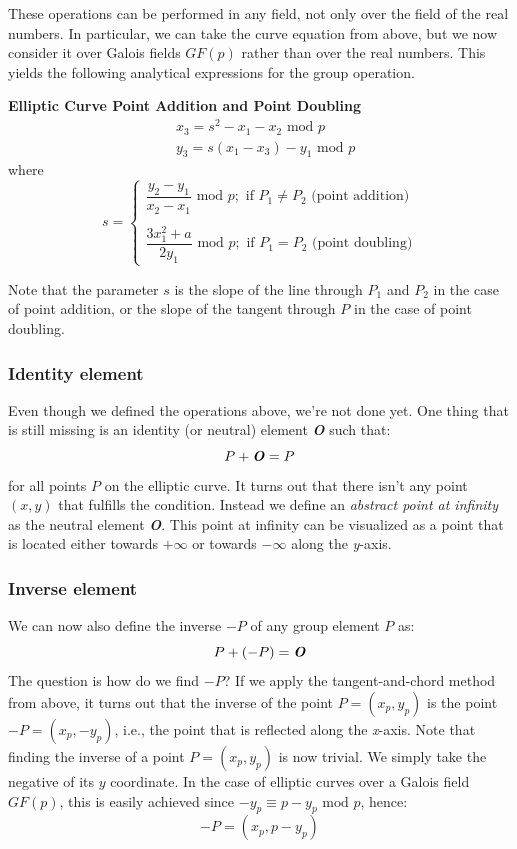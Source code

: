 \documentclass[11pt, a4paper]{article}
\newcommand{\mymod}{
    \text{ mod }
}
\begin{document}
\newpage
\hfill\break
These operations can be performed in any field, not only over the field of the real numbers. In particular, we can take the curve equation from above, but we now consider it over Galois fields $GF(p)$ rather than over the real numbers. This yields the following analytical expressions for the group operation.
\begin{framed}
    \hfill\break\textbf{Elliptic Curve Point Addition and Point Doubling}
    \begin{align*}
        &x_3=s^2-x_1-x_2\mymod p\\
        &y_3=s(x_1-x_3)-y_1\mymod p
    \end{align*}
    where
    \begin{equation*}
        s=\begin{cases}
            \dfrac{y_2-y_1}{x_2-x_1}\mymod p; \text{ if $P_1\not=P_2$ (point addition)}\\\\
            \dfrac{3x_1^2+a}{2y_1}\mymod p; \text{ if $P_1=P_2$ (point doubling)}
        \end{cases}
    \end{equation*}
\end{framed}
Note that the parameter $s$ is the slope of the line through $P_1$ and $P_2$ in the case of point addition, or the slope of the tangent through $P$ in the case of point doubling.

\subsubsection{Identity element}
Even though we defined the operations above, we're not done yet. One thing that is still missing is an identity (or neutral) element \textit{\textbf{O}} such that:
$$P+\text{\textbf{\textit{O}}}=P$$
for all points $P$ on the elliptic curve. It turns out that there isn't any point $(x,y)$ that fulfills the condition. Instead we define an \textit{abstract point at infinity} as the neutral element \textbf{\textit{O}}. This point at infinity can be visualized as a point that is located either towards $+\infty$ or towards $-\infty$ along the \textit{y}-axis.

\subsubsection{Inverse element}
We can now also define the inverse $-P$ of any group element $P$ as:
$$P+(-P)=\text{\textbf{\textit{O}}}$$
The question is how do we find $-P$? If we apply the tangent-and-chord method from above, it turns out that the inverse of the point $P=(x_p,y_p)$ is the point $-P=(x_p,-y_p)$, i.e., the point that is reflected along the \textit{x}-axis. Note that finding the inverse of a point $P=(x_p,y_p)$ is now trivial. We simply take the negative of its $y$ coordinate. In the case of elliptic curves over a Galois field $GF(p)$, this is easily achieved since $-y_p\equiv p-y_p\mymod p$, hence:
$$-P=(x_p,p-y_p)$$
\end{document}
